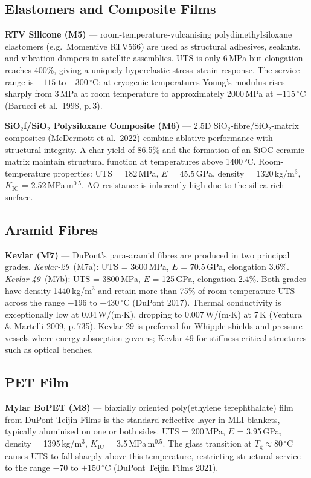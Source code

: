 \documentclass[11pt,a4paper]{article}
\begin{document}
\subsection*{Elastomers and Composite Films}

\textbf{RTV Silicone (M5)} — room-temperature-vulcanising polydimethylsiloxane
elastomers (e.g.\ Momentive RTV566) are used as structural adhesives, sealants,
and vibration dampers in satellite assemblies. UTS is only 6\,MPa but elongation
reaches 400\%, giving a uniquely hyperelastic stress--strain response. The
service range is $-115$ to $+300\,^{\circ}$C; at cryogenic temperatures Young's
modulus rises sharply from 3\,MPa at room temperature to approximately
2000\,MPa at $-115\,^{\circ}$C (Barucci et al.\ 1998, p.\,3).

\textbf{SiO$_{2}$f/SiO$_{2}$ Polysiloxane Composite (M6)} — 2.5D
SiO$_{2}$-fibre/SiO$_{2}$-matrix composites (McDermott et al.\ 2022) combine
ablative performance with structural integrity. A char yield of 86.5\% and the
formation of an SiOC ceramic matrix maintain structural function at temperatures
above 1400\,°C. Room-temperature properties: UTS = 182\,MPa, $E$ = 45.5\,GPa,
density = 1320\,kg/m$^{3}$, $K_{\mathrm{IC}}$ = 2.52\,MPa$\,\mathrm{m}^{0.5}$.
AO resistance is inherently high due to the silica-rich surface.

\subsection*{Aramid Fibres}

\textbf{Kevlar (M7)} — DuPont's para-aramid fibres are produced in two principal
grades. \textit{Kevlar-29}~(M7a): UTS = 3600\,MPa, $E$ = 70.5\,GPa, elongation
3.6\%. \textit{Kevlar-49}~(M7b): UTS = 3800\,MPa, $E$ = 125\,GPa, elongation
2.4\%. Both grades have density 1440\,kg/m$^{3}$ and retain more than 75\% of
room-temperature UTS across the range $-196$ to $+430\,^{\circ}$C (DuPont 2017).
Thermal conductivity is exceptionally low at 0.04\,W/(m$\cdot$K), dropping to
0.007\,W/(m$\cdot$K) at 7\,K (Ventura \& Martelli 2009, p.\,735). Kevlar-29 is
preferred for Whipple shields and pressure vessels where energy absorption governs;
Kevlar-49 for stiffness-critical structures such as optical benches.

\subsection*{PET Film}

\textbf{Mylar BoPET (M8)} — biaxially oriented poly(ethylene terephthalate) film
from DuPont Teijin Films is the standard reflective layer in MLI blankets,
typically aluminised on one or both sides. UTS = 200\,MPa, $E$ = 3.95\,GPa,
density = 1395\,kg/m$^{3}$, $K_{\mathrm{IC}}$ = 3.5\,MPa$\,\mathrm{m}^{0.5}$.
The glass transition at $T_{\mathrm{g}} \approx 80\,^{\circ}$C causes UTS to
fall sharply above this temperature, restricting structural service to the range
$-70$ to $+150\,^{\circ}$C (DuPont Teijin Films 2021).
\end{document}
